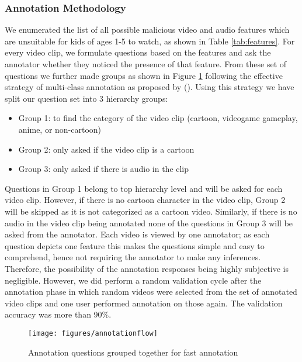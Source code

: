 \documentclass[letterpaper]{article}
\begin{document}
\subsubsection{Annotation Methodology}
We enumerated the list of all possible malicious video and audio features which are unsuitable for kids of ages 1-5 to watch, as shown in Table \ref{tab:features}.   For every video clip, we formulate questions based on the features and ask the annotator whether they noticed the presence of that feature. From these set of questions we further made groups as shown in Figure \ref{fig:annotationflow} following the effective strategy of multi-class annotation as proposed by \citeauthor{stanford_annotation_paper} (\citeyear{stanford_annotation_paper}). Using this strategy we have split our question set into 3 hierarchy groups:
\begin{itemize}
    \item Group 1: to find the category of the video clip (cartoon, videogame gameplay, anime, or non-cartoon)
    \item Group 2: only asked if the video clip is a cartoon
    \item Group 3: only asked if there is audio in the clip
\end{itemize}
Questions in Group 1 belong to top hierarchy level and will be asked for each video clip. However, if there is no cartoon character in the video clip, Group 2 will be skipped as it is not categorized as a cartoon video. Similarly, if there is no audio in the video clip being annotated none of the questions in Group 3 will be asked from the annotator.
Each video is viewed by one annotator; as each question depicts one feature this makes the questions simple and easy to comprehend, hence not requiring the annotator to make any inferences. Therefore, the possibility of the annotation responses being highly subjective is negligible. However, we did perform a random validation cycle after the annotation phase in which random videos were selected from the set of annotated video clips and one user performed annotation on those again. The validation accuracy was more than 90\%. 

\begin{figure}[htp]
    \centering
    \texttt{[image: figures/annotationflow]}
    \caption{Annotation questions grouped together for fast annotation}
    \label{fig:annotationflow}
\end{figure}
\end{document}
